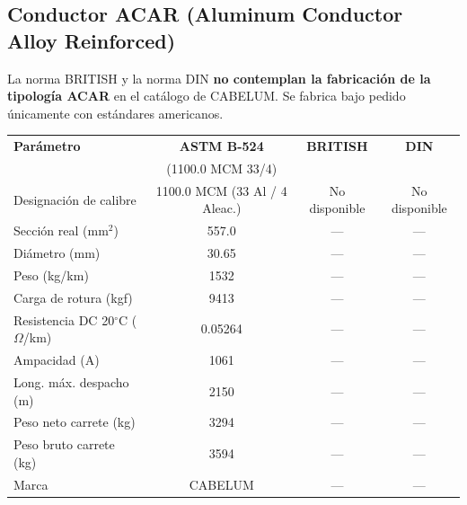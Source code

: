 \documentclass[12pt,a4paper]{article}
\begin{document}
\begin{landscape}
\subsection{Conductor ACAR (Aluminum Conductor Alloy Reinforced)}

La norma BRITISH y la norma DIN \textbf{no contemplan la fabricación de la
tipología ACAR} en el catálogo de CABELUM. Se fabrica bajo pedido únicamente
con estándares americanos.

\begin{center}
\begin{tabular}{p{4cm}c|c|c}
\toprule
\textbf{Parámetro} & \textbf{ASTM B-524} & \textbf{BRITISH} & \textbf{DIN} \\
& (1100.0 MCM 33/4) & & \\
\midrule
Designación de calibre & 1100.0 MCM (33 Al / 4 Aleac.) & No disponible & No disponible \\
\midrule
Sección real (mm$^2$) & 557.0 & --- & --- \\
\midrule
Diámetro (mm) & 30.65 & --- & --- \\
\midrule
Peso (kg/km) & 1532 & --- & --- \\
\midrule
Carga de rotura (kgf) & 9413 & --- & --- \\
\midrule
Resistencia DC 20$^\circ$C ($\Omega$/km) & 0.05264 & --- & --- \\
\midrule
Ampacidad (A) & 1061 & --- & --- \\
\midrule
Long. máx. despacho (m) & 2150 & --- & --- \\
\midrule
Peso neto carrete (kg) & 3294 & --- & --- \\
\midrule
Peso bruto carrete (kg) & 3594 & --- & --- \\
\midrule
Marca & CABELUM & --- & --- \\
\bottomrule
\end{tabular}
\end{center}
\end{landscape}
\end{document}
